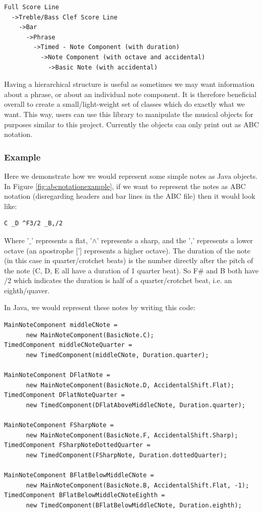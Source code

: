 \documentclass[pdftex,12pt,a4paper]{report}
\begin{document}
\begin{verbatim}
Full Score Line
  ->Treble/Bass Clef Score Line
    ->Bar
      ->Phrase
        ->Timed - Note Component (with duration)
          ->Note Component (with octave and accidental)
            ->Basic Note (with accidental)
\end{verbatim}

Having a hierarchical structure is useful as sometimes we may want information about a phrase, or about an individual note component. It is therefore beneficial overall to create a small/light-weight set of classes which do exactly what we want. This way, users can use this library to manipulate the musical objects for purposes similar to this project. Currently the objects can only print out as ABC notation.

\subsubsection{Example}
Here we demonstrate how we would represent some simple notes as Java objects. In Figure \ref{fig:abcnotationexample}, if we want to represent the notes as ABC notation (disregarding headers and bar lines in the ABC file) then it would look like:

\begin{verbatim}
C _D ^F3/2 _B,/2
\end{verbatim}

Where '$\_$' represents a flat, '$\wedge$' represents a sharp, and the ',' represents a lower octave (an apostrophe ['] represents a higher octave). The duration of the note (in this case in quarter/crotchet beats) is the number directly after the pitch of the note (C, D, E all have a duration of 1 quarter beat). So F\# and B both have /2 which indicates the duration is half of a quarter/crotchet beat, i.e. an eighth/quaver.

In Java, we would represent these notes by writing this code:

\begin{lstlisting}
MainNoteComponent middleCNote = 
      new MainNoteComponent(BasicNote.C);
TimedComponent middleCNoteQuarter = 
      new TimedComponent(middleCNote, Duration.quarter);

MainNoteComponent DFlatNote = 
      new MainNoteComponent(BasicNote.D, AccidentalShift.Flat);
TimedComponent DFlatNoteQuarter = 
      new TimedComponent(DFlatAboveMiddleCNote, Duration.quarter);

MainNoteComponent FSharpNote = 
      new MainNoteComponent(BasicNote.F, AccidentalShift.Sharp);
TimedComponent FSharpNoteDottedQuarter = 
      new TimedComponent(FSharpNote, Duration.dottedQuarter);

MainNoteComponent BFlatBelowMiddleCNote = 
      new MainNoteComponent(BasicNote.B, AccidentalShift.Flat, -1);
TimedComponent BFlatBelowMiddleCNoteEighth = 
      new TimedComponent(BFlatBelowMiddleCNote, Duration.eighth);

\end{lstlisting}
\end{document}
